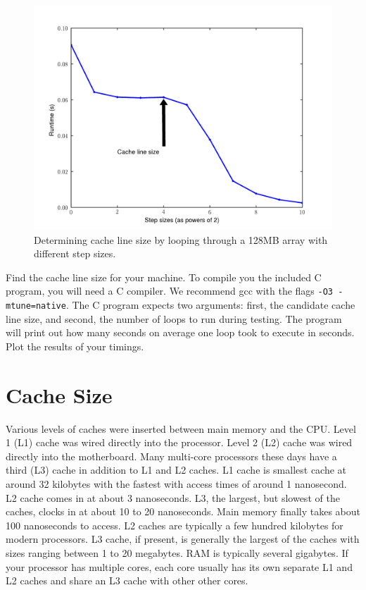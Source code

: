 \begin{figure}
\centering
\includegraphics[width=\textwidth]{cache_line.pdf}
\caption{Determining cache line size by looping through a 128MB array with different step sizes.}
\label{fig:linesize}
\end{figure}


\begin{problem}
Find the cache line size for your machine.
To compile you the included C program, you will need a C compiler.
We recommend gcc with the flags \texttt{-O3 -mtune=native}.
The C program expects two arguments: first, the candidate cache line size, and second, the number of loops to run during testing.
The program will print out how many seconds on average one loop took to execute in seconds.
Plot the results of your timings.
\label{prob:cacheline}
\end{problem}

\section*{Cache Size}
Various levels of caches were inserted between main memory and the CPU.  
Level 1 (L1) cache was wired directly into the processor.  Level 2 (L2) cache was wired directly into the motherboard.  
Many multi-core processors these days have a third (L3) cache in addition to L1 and L2 caches.  
L1 cache is smallest cache at around 32 kilobytes with the fastest with access times of around 1 nanosecond.  
L2 cache comes in at about 3 nanoseconds.  L3, the largest, but slowest of the caches, clocks in at about 10 to 20 nanoseconds. 
Main memory finally takes about 100 nanoseconds to access.  L2 caches are typically a few hundred kilobytes for modern processors. 
L3 cache, if present, is generally the largest of the caches with sizes ranging between 1 to 20 megabytes. 
RAM is typically several gigabytes.  If your processor has multiple cores, each core usually has its own separate L1 and L2 caches and share an L3 cache with other other cores.

